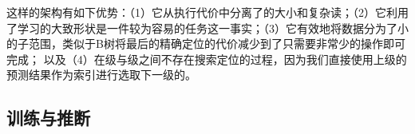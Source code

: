 
这样的架构有如下优势：（1）它从执行代价中分离了{\model}的大小和复杂读；（2）它利用了学习{\cdf}的大致形状是一件较为容易的任务这一事实；（3）它有效地将数据分为了小的子范围，类似于B树将最后的精确定位的代价减少到了只需要非常少的操作即可完成；
以及（4）在级与级之间不存在搜索定位的过程，因为我们直接使用上级{\model}的预测结果作为索引进行选取下一级的{\model}。


\subsection{{\rmi}训练与推断}
\label{sec:rmi-train-inference}

